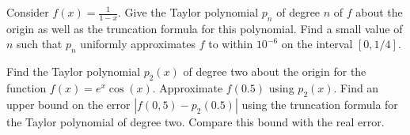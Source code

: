 \begin{question}
Consider $\displaystyle f(x) = \frac{1}{1-x}$.  Give the Taylor
polynomial $p_n$ of degree $n$ of $f$ about the origin as well as the
truncation formula for this polynomial.  Find a small value of $n$
such that $p_n$ uniformly approximates $f$ to within $10^{-6}$ on the
interval $[0,1/4]$.
\label{approxBQ2}
\end{question}

\begin{question}
Find the Taylor polynomial $p_2(x)$ of degree two about the origin for
the function $f(x)=e^x\cos(x)$.  Approximate $f(0.5)$ using
$p_2(x)$.  Find an upper bound on the error $|f(0,5)-p_2(0.5)|$ using
the truncation formula for the Taylor polynomial of degree two.
Compare this bound with the real error.
\label{approxBQ3}
\end{question}

